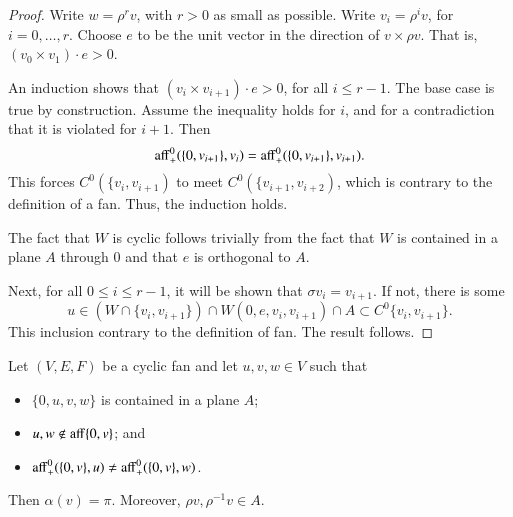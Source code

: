 \begin{proof}  Write $w = \rho^r v$, with $r>0$ as small as possible.
Write $v_i = \rho^i v$, for $i=0,\ldots,r$.
Choose $e$ to be the unit vector in the direction of $v\times \rho v$.
That is, $(v_0\times v_1)\cdot e > 0$.    

An induction shows that
$(v_i \times v_{i+1})\cdot e > 0$, for all $i\le r-1$.  
The base case is true by construction.
Assume the inequality holds for $i$, and for a contradiction
that it is violated for $i+1$.
Then 
$${\operatorname{aff}}^0_+(\{0,v_{i+1}\},v_i) = {\operatorname{aff}}^0_+(\{0,v_{i+1}\},v_{i+1}).$$ 
This forces $C^0(\{v_i,v_{i+1})$ to meet $C^0(\{v_{i+1},v_{i+2})$, which
is contrary to the definition of a fan.  Thus, the induction holds.

The fact that $W$ is cyclic follows trivially from the fact that $W$ is contained in a plane $A$ through $0$ and that $e$ is orthogonal to $A$.

Next, for all $0\le i \le r-1$, it will be shown that $\sigma v_i = v_{i+1}$.
If not, there is some 
$$u \in (W\cap \{v_i,v_{i+1}\}) \cap W(0,e,v_i,v_{i+1}) \cap A
  \subset C^0\{v_i,v_{i+1}\}.
$$
This inclusion contrary to the definition of fan.  The result follows.
\end{proof}

\begin{lemma} \label{lemma:A}  Let $(V,E,F)$ be a cyclic fan and let
$u,v,w\in V$ such that
\begin{itemize}
\item $\{0,u,v,w\}$ is contained in a plane $A$; \vspace{3pt}
\item $u,w\not\in{\operatorname{aff}}\{0,v\}$; and \vspace{3pt}
\item ${\operatorname{aff}}^0_+(\{0,v\},u) \ne {\operatorname{aff}}^0_+(\{0,v\},w)$.
\end{itemize}
Then $\alpha(v) = \pi$.  Moreover, $\rho v,\rho^{-1} v\in A$.
\end{lemma}

